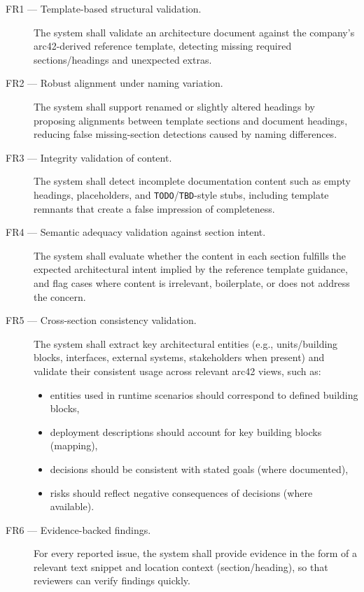 \begin{description}
    \item[FR1 --- Template-based structural validation.] The system shall validate an architecture document against the company’s arc42-derived reference template, detecting missing required sections/headings and unexpected extras.

    \item[FR2 --- Robust alignment under naming variation.] The system shall support renamed or slightly altered headings by proposing alignments between template sections and document headings, reducing false missing-section detections caused by naming differences.

    \item[FR3 --- Integrity validation of content.] The system shall detect incomplete documentation content such as empty headings, placeholders, and \texttt{TODO}/\texttt{TBD}-style stubs, including template remnants that create a false impression of completeness.

    \item[FR4 --- Semantic adequacy validation against section intent.] The system shall evaluate whether the content in each section fulfills the expected architectural intent implied by the reference template guidance, and flag cases where content is irrelevant, boilerplate, or does not address the concern.

    \item[FR5 --- Cross-section consistency validation.] The system shall extract key architectural entities (e.g., units/building blocks, interfaces, external systems, stakeholders when present) and validate their consistent usage across relevant arc42 views, such as:
    \begin{itemize}
        \item entities used in runtime scenarios should correspond to defined building blocks,
        \item deployment descriptions should account for key building blocks (mapping),
        \item decisions should be consistent with stated goals (where documented),
        \item risks should reflect negative consequences of decisions (where available).
    \end{itemize}

    \item[FR6 --- Evidence-backed findings.] For every reported issue, the system shall provide evidence in the form of a relevant text snippet and location context (section/heading), so that reviewers can verify findings quickly.


\end{description}

